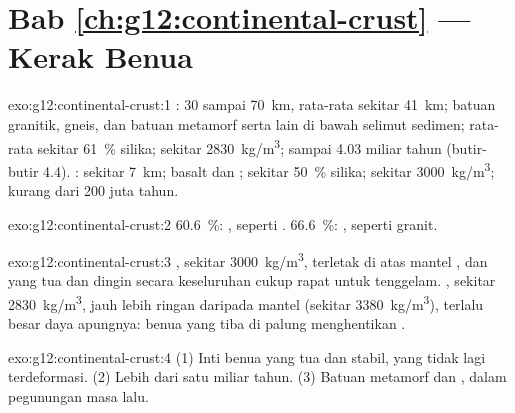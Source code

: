 \section*{Bab \ref{ch:g12:continental-crust} --- Kerak Benua}

\begin{solution}{exo:g12:continental-crust:1}
: 30 sampai \qty{70}{km}, rata-rata sekitar \qty{41}{km}; batuan
granitik, gneis, dan batuan metamorf serta  lain di bawah selimut
sedimen; rata-rata sekitar \qty{61}{\percent} silika; sekitar
\qty{2830}{kg/m^3}; sampai 4.03 miliar tahun (butir-butir 4.4). :
sekitar \qty{7}{km}; basalt dan ; sekitar \qty{50}{\percent} silika;
sekitar \qty{3000}{kg/m^3}; kurang dari 200 juta tahun.
\end{solution}

\begin{solution}{exo:g12:continental-crust:2}
\qty{60.6}{\percent}: , seperti . \qty{66.6}{\percent}:
, seperti granit.
\end{solution}

\begin{solution}{exo:g12:continental-crust:3}
, sekitar \qty{3000}{kg/m^3}, terletak di atas mantel ,
dan  yang tua dan dingin secara keseluruhan cukup rapat untuk
tenggelam. , sekitar \qty{2830}{kg/m^3}, jauh lebih ringan daripada
mantel (sekitar \qty{3380}{kg/m^3}), terlalu besar daya apungnya: benua yang
tiba di palung menghentikan .
\end{solution}

\begin{solution}{exo:g12:continental-crust:4}
(1) Inti benua yang tua dan stabil, yang tidak lagi terdeformasi. (2) Lebih
dari satu miliar tahun. (3) Batuan metamorf dan ,  dalam
pegunungan masa lalu.
\end{solution}

